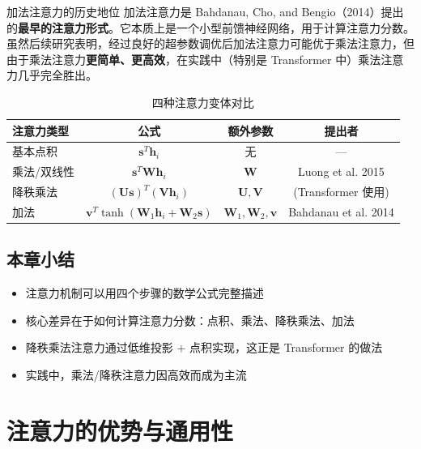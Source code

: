 \documentclass[a4paper]{article}
\begin{document}
\begin{knowledgebox}{加法注意力的历史地位}
加法注意力是 Bahdanau, Cho, and Bengio（2014）提出的\textbf{最早的注意力形式}。它本质上是一个小型前馈神经网络，用于计算注意力分数。虽然后续研究表明，经过良好的超参数调优后加法注意力可能优于乘法注意力，但由于乘法注意力\textbf{更简单、更高效}，在实践中（特别是 Transformer 中）乘法注意力几乎完全胜出。
\end{knowledgebox}

\begin{table}[H]
\centering
\begin{tabular}{lccc}
\toprule
\textbf{注意力类型} & \textbf{公式} & \textbf{额外参数} & \textbf{提出者} \\
\midrule
基本点积 & $\mathbf{s}^T \mathbf{h}_i$ & 无 & --- \\
乘法/双线性 & $\mathbf{s}^T \mathbf{W} \mathbf{h}_i$ & $\mathbf{W}$ & Luong et al. 2015 \\
降秩乘法 & $(\mathbf{U}\mathbf{s})^T(\mathbf{V}\mathbf{h}_i)$ & $\mathbf{U}, \mathbf{V}$ & (Transformer 使用) \\
加法 & $\mathbf{v}^T \tanh(\mathbf{W}_1 \mathbf{h}_i + \mathbf{W}_2 \mathbf{s})$ & $\mathbf{W}_1, \mathbf{W}_2, \mathbf{v}$ & Bahdanau et al. 2014 \\
\bottomrule
\end{tabular}
\caption{四种注意力变体对比}
\end{table}

\subsection{本章小结}

\begin{itemize}
    \item 注意力机制可以用四个步骤的数学公式完整描述
    \item 核心差异在于如何计算注意力分数：点积、乘法、降秩乘法、加法
    \item 降秩乘法注意力通过低维投影 + 点积实现，这正是 Transformer 的做法
    \item 实践中，乘法/降秩注意力因高效而成为主流
\end{itemize}


\section{注意力的优势与通用性}
\end{document}

